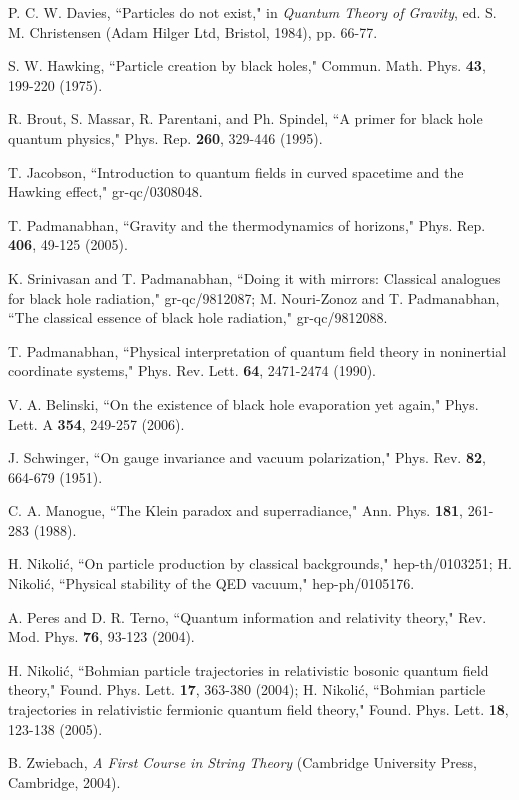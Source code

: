 \documentclass[12pt]{article}
\begin{document}
\begin{thebibliography}{99}
P. C. W. Davies, 
``Particles do not exist,"
in {\it Quantum Theory of Gravity}, ed. S. M. Christensen
(Adam Hilger Ltd, Bristol, 1984), pp. 66-77.

S. W. Hawking,
``Particle creation by black holes,"
Commun. Math. Phys. {\bf 43}, 199-220 (1975).

R. Brout, S. Massar, R. Parentani, and Ph. Spindel,
``A primer for black hole quantum physics,"
Phys. Rep. {\bf 260}, 329-446 (1995).

T. Jacobson,
``Introduction to quantum fields in curved spacetime and the Hawking
effect,"
gr-qc/0308048.

T. Padmanabhan,
``Gravity and the thermodynamics of horizons,"
Phys. Rep. {\bf 406}, 49-125 (2005).

K. Srinivasan and T. Padmanabhan,
``Doing it with mirrors: Classical analogues for black hole radiation,"
gr-qc/9812087;
M. Nouri-Zonoz and T. Padmanabhan, 
``The classical essence of black hole radiation,"
gr-qc/9812088.

T. Padmanabhan,
``Physical interpretation of quantum field theory in 
noninertial coordinate systems,"
Phys. Rev. Lett. {\bf 64}, 2471-2474 (1990).

V. A. Belinski, 
``On the existence of black hole evaporation yet again,"
Phys. Lett. A {\bf 354}, 249-257 (2006).

J. Schwinger,
``On gauge invariance and vacuum polarization,"
Phys. Rev. {\bf 82}, 664-679 (1951).

C. A. Manogue,
``The Klein paradox and superradiance,"
Ann. Phys. {\bf 181}, 261-283 (1988).

H. Nikoli\'c,
``On particle production by classical backgrounds,"
hep-th/0103251;
H. Nikoli\'c,
``Physical stability of the QED vacuum,"
hep-ph/0105176.

A. Peres and D. R. Terno,
``Quantum information and relativity theory,"
Rev. Mod. Phys. {\bf 76}, 93-123 (2004).

H. Nikoli\'c,
``Bohmian particle trajectories in relativistic bosonic quantum field
theory,"
Found. Phys. Lett. {\bf 17}, 363-380 (2004);
H. Nikoli\'c,
``Bohmian particle trajectories in relativistic fermionic quantum field
theory,"
Found. Phys. Lett. {\bf 18}, 123-138 (2005).

B. Zwiebach, {\it A First Course in String Theory}
(Cambridge University Press, Cambridge, 2004).


\end{thebibliography}
\end{document}

